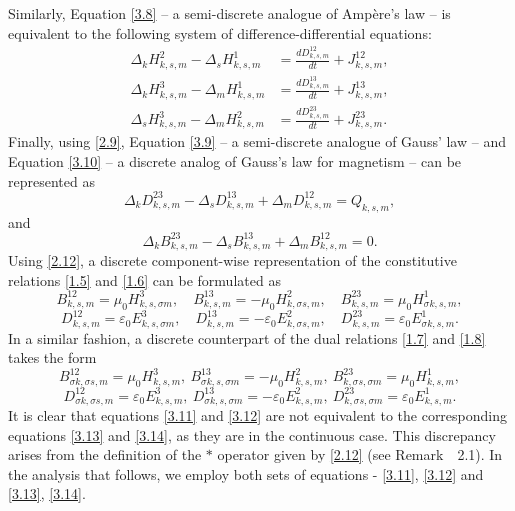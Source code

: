 \documentclass[english]{article}
\theoremstyle{plain}
\theoremstyle{definition}
\theoremstyle{remark}
\numberwithin{equation}{section}
\begin{document}
Similarly,  Equation \eqref{3.8} -- a semi-discrete analogue of Ampère’s law -- is equivalent to the following system of difference-differential equations:
\begin{align*}
\Delta_k H^2_{k,s,m} - \Delta_s H^1_{k,s,m} &= \frac{dD^{12}_{k,s,m}}{dt}  + J^{12}_{k,s,m}, \\
\Delta_k H^3_{k,s,m} - \Delta_m H^1_{k,s,m} &= \frac{dD^{13}_{k,s,m}}{dt}  + J^{13}_{k,s,m}, \\
\Delta_s H^3_{k,s,m} - \Delta_m H^2_{k,s,m} &= \frac{dD^{23}_{k,s,m}}{dt}  + J^{23}_{k,s,m}.
\end{align*}
Finally, using \eqref{2.9},  Equation \eqref{3.9}  -- a semi-discrete analogue of Gauss’ law -- and Equation \eqref{3.10} -- a discrete analog of Gauss's law for magnetism --
 can be represented as
\begin{equation*}\label{}
    \Delta_kD^{23}_{k,s,m}-\Delta_sD^{13}_{k,s,m}+\Delta_mD^{12}_{k,s,m}=Q_{k,s,m},
\end{equation*}
and
\begin{equation*}\label{}
    \Delta_kB^{23}_{k,s,m}-\Delta_sB^{13}_{k,s,m}+\Delta_mB^{12}_{k,s,m}=0.
\end{equation*}
Using \eqref{2.12},  a discrete component-wise representation of the constitutive relations \eqref{1.5} and \eqref{1.6} can be formulated as
 \begin{equation}\label{3.11}
B^{12}_{k,s,m}=\mu_0H^3_{k,s,\sigma m}, \quad B^{13}_{k,s,m}=-\mu_0H^2_{k,\sigma s, m}, \quad B^{23}_{k,s,m}=\mu_0H^1_{\sigma k,s, m},
\end{equation}
 \begin{equation}\label{3.12}
D^{12}_{k,s,m}=\varepsilon_0E^3_{k,s,\sigma m}, \quad D^{13}_{k,s,m}=-\varepsilon_0E^2_{k,\sigma s, m}, \quad D^{23}_{k,s,m}=\varepsilon_0E^1_{\sigma k,s, m}.
\end{equation}
In a similar fashion, a discrete counterpart of the dual relations \eqref{1.7} and \eqref{1.8} takes the form
\begin{equation}\label{3.13}
B^{12}_{\sigma k,\sigma s,m}=\mu_0H^3_{k,s, m}, \ B^{13}_{\sigma k,s,\sigma m}=-\mu_0H^2_{k,s, m}, \
 B^{23}_{k,\sigma s, \sigma m}=\mu_0H^1_{k,s, m},
\end{equation}
 \begin{equation}\label{3.14}
D^{12}_{\sigma k,\sigma s,m}=\varepsilon_0E^3_{k,s, m}, \ D^{13}_{\sigma k,s,\sigma m}=-\varepsilon_0E^2_{k, s, m},
 \ D^{23}_{k,\sigma s,\sigma m}=\varepsilon_0E^1_{k,s, m}.
\end{equation}
It is clear that equations \eqref{3.11} and \eqref{3.12} are not equivalent to the corresponding equations \eqref{3.13} and \eqref{3.14}, as they are in the continuous case.  This discrepancy arises from the definition of the $\ast$ operator given by \eqref{2.12} (see Remark~~2.1). In the analysis that follows, we employ both sets of equations - \eqref{3.11}, \eqref{3.12} and \eqref{3.13}, \eqref{3.14}.
\end{document}
